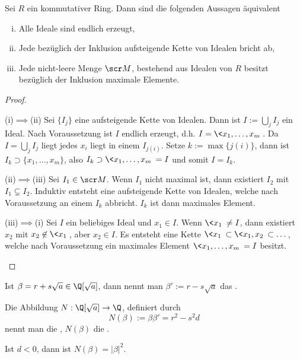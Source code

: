 
\begin{st} \label{4.6}
	Sei $R$ ein kommutativer Ring.
	Dann sind die folgenden Aussagen äquivalent
	\begin{enumerate}[(i)]
		\item
			Alle Ideale sind endlich erzeugt,
		\item
			Jede bezüglich der Inklusion aufsteigende Kette von Idealen bricht ab,
		\item
			Jede nicht-leere Menge $\scr M$, bestehend aus Idealen von $R$ besitzt bezüglich der Inklusion maximale Elemente.
	\end{enumerate}
	\begin{proof}
		\begin{seg}{(i)$\implies$(ii)}
			Sei $\{I_j\}$ eine aufsteigende Kette von Idealen.
			Dann ist $I := \bigcup_{j} I_j$ ein Ideal.
			Nach Voraussetzung ist $I$ endlich erzeugt, d.h. $I = \<x_1, \dotsc, x_m\>$.
			Da $I = \bigcup_j I_j$ liegt jedes $x_i$ liegt in einem $I_{j(i)}$.
			Setze $k := \max \{j(i)\}$, dann ist $I_k \supset \{x_1, \dotsc, x_m\}$, also $I_k \supset \<x_1, \dotsc, x_m\> = I$ und somit $I = I_k$.
		\end{seg}
		\begin{seg}{(ii)$\implies$(iii)}
			Sei $I_1 \in \scr M$.
			Wenn $I_1$ nicht maximal ist, dann existiert $I_2$ mit $I_1 \subsetneq I_2$.
			Induktiv entsteht eine aufsteigende Kette von Idealen, welche nach Voraussetzung an einem $I_k$ abbricht.
			$I_k$ ist dann maximales Element.
		\end{seg}
		\begin{seg}{(iii)$\implies$(i)}
			Sei $I$ ein beliebiges Ideal und $x_1 \in I$.
			Wenn $\<x_1\> \neq I$, dann existiert $x_2$ mit $x_2 \not\in \<x_1\>$, aber $x_2 \in I$.
			Es entsteht eine Kette $\<x_1\> \subset \<x_1, x_2\> \subset \dotsc$, welche nach Voraussetzung ein maximales Element $\<x_1, \dotsc, x_m\> = I$ besitzt.
		\end{seg}
	\end{proof}
\end{st}

\begin{df} \label{4.7}
	Ist $\beta = r + s\sqrt a \in \Q[\sqrt a]$, dann nennt man $\beta' := r - s\sqrt a$ das .

	Die Abbildung $N: \Q[\sqrt a] \to \Q$, definiert durch
	\[
		N(\beta) := \beta \beta' = r^2 - s^2 d
	\]
	nennt man die , $N(\beta)$ die .
	\begin{note}
		Ist $d < 0$, dann ist $N(\beta) = |\beta|^2$.
	\end{note}
\end{df}

